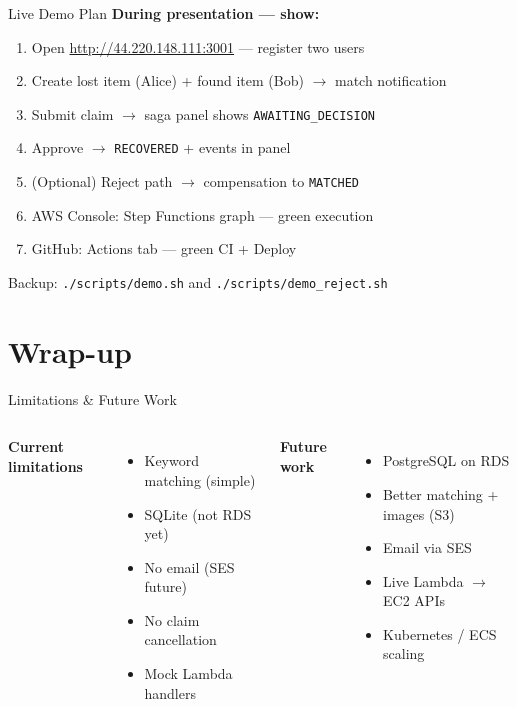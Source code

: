 \documentclass[11pt,aspectratio=169]{beamer}
\begin{document}
\begin{frame}{Live Demo Plan}
  \textbf{During presentation — show:}
  \begin{enumerate}
    \item Open \url{http://44.220.148.111:3001} — register two users
    \item Create lost item (Alice) + found item (Bob) $\rightarrow$ match notification
    \item Submit claim $\rightarrow$ saga panel shows \texttt{AWAITING\_DECISION}
    \item Approve $\rightarrow$ \texttt{RECOVERED} + events in panel
    \item (Optional) Reject path $\rightarrow$ compensation to \texttt{MATCHED}
    \item AWS Console: Step Functions graph — green execution
    \item GitHub: Actions tab — green CI + Deploy
  \end{enumerate}
  \vspace{0.2cm}
  \footnotesize Backup: \texttt{./scripts/demo.sh} and \texttt{./scripts/demo\_reject.sh}
\end{frame}

\section{Wrap-up}

\begin{frame}{Limitations \& Future Work}
  \begin{columns}[T]
    \textbf{Current limitations}
    \begin{itemize}
      \item Keyword matching (simple)
      \item SQLite (not RDS yet)
      \item No email (SES future)
      \item No claim cancellation
      \item Mock Lambda handlers
    \end{itemize}
    \textbf{Future work}
    \begin{itemize}
      \item PostgreSQL on RDS
      \item Better matching + images (S3)
      \item Email via SES
      \item Live Lambda $\rightarrow$ EC2 APIs
      \item Kubernetes / ECS scaling
    \end{itemize}
  \end{columns}
\end{frame}
\end{document}
